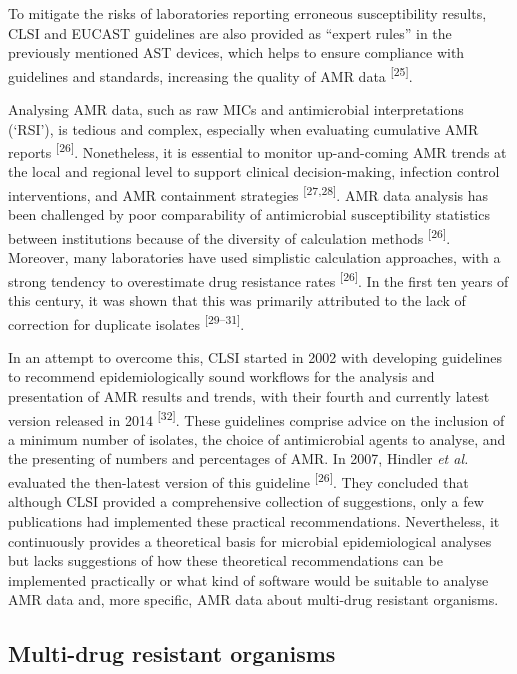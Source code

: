 \documentclass[
]{book}
\begin{document}
To mitigate the risks of laboratories reporting erroneous susceptibility results, CLSI and EUCAST guidelines are also provided as ``expert rules'' in the previously mentioned AST devices, which helps to ensure compliance with guidelines and standards, increasing the quality of AMR data \textsuperscript{{[}25{]}}.

Analysing AMR data, such as raw MICs and antimicrobial interpretations (`RSI'), is tedious and complex, especially when evaluating cumulative AMR reports \textsuperscript{{[}26{]}}. Nonetheless, it is essential to monitor up-and-coming AMR trends at the local and regional level to support clinical decision-making, infection control interventions, and AMR containment strategies \textsuperscript{{[}27,28{]}}. AMR data analysis has been challenged by poor comparability of antimicrobial susceptibility statistics between institutions because of the diversity of calculation methods \textsuperscript{{[}26{]}}. Moreover, many laboratories have used simplistic calculation approaches, with a strong tendency to overestimate drug resistance rates \textsuperscript{{[}26{]}}. In the first ten years of this century, it was shown that this was primarily attributed to the lack of correction for duplicate isolates \textsuperscript{{[}29--31{]}}.

In an attempt to overcome this, CLSI started in 2002 with developing guidelines to recommend epidemiologically sound workflows for the analysis and presentation of AMR results and trends, with their fourth and currently latest version released in 2014 \textsuperscript{{[}32{]}}. These guidelines comprise advice on the inclusion of a minimum number of isolates, the choice of antimicrobial agents to analyse, and the presenting of numbers and percentages of AMR. In 2007, Hindler \emph{et al.} evaluated the then-latest version of this guideline \textsuperscript{{[}26{]}}. They concluded that although CLSI provided a comprehensive collection of suggestions, only a few publications had implemented these practical recommendations. Nevertheless, it continuously provides a theoretical basis for microbial epidemiological analyses but lacks suggestions of how these theoretical recommendations can be implemented practically or what kind of software would be suitable to analyse AMR data and, more specific, AMR data about multi-drug resistant organisms.

\hypertarget{multi-drug-resistant-organisms}{%
\subsection{Multi-drug resistant organisms}\label{multi-drug-resistant-organisms}}
\end{document}
